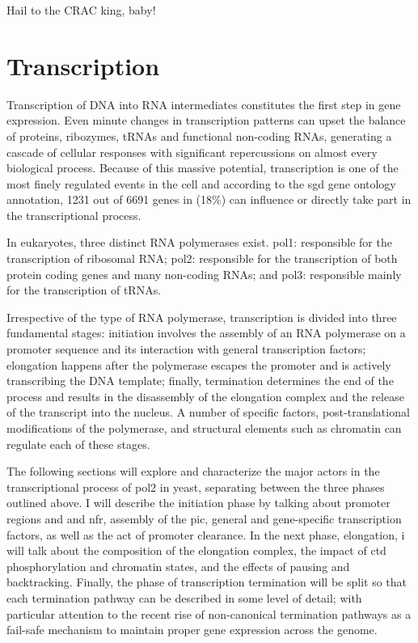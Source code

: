 \begin{savequote}[70mm]
Hail to the CRAC king, baby!
\end{savequote}

\chapter{Transcription}

Transcription of DNA into RNA intermediates constitutes the first step in gene expression.
Even minute changes in transcription patterns can upset the balance of proteins, ribozymes, tRNAs and functional non-coding RNAs, generating a cascade of cellular responses with  significant repercussions on almost every biological process.
Because of this massive potential, transcription is one of the most finely regulated events in the cell and according to the \gls{sgd} \cite{cherry:2012:saccharomyces} gene ontology annotation, 1231 out of 6691 genes in \cer (18\%) can influence or directly take part in the transcriptional process.

In eukaryotes, three distinct RNA polymerases exist. \gls{pol1}: responsible for the transcription of ribosomal RNA; \gls{pol2}: responsible for the transcription of both protein coding genes and many non-coding RNAs; and \gls{pol3}: responsible mainly for the transcription of tRNAs. 

Irrespective of the type of RNA polymerase, transcription is divided into three fundamental stages: initiation involves the assembly of an RNA polymerase on a promoter sequence and its interaction with general transcription factors; elongation happens after the polymerase escapes the promoter and is actively transcribing the DNA template; finally, termination determines the end of the process and results in the disassembly of the elongation complex and the release of the transcript into the nucleus. 
A number of specific factors, post-translational modifications of the polymerase, and structural elements such as chromatin can regulate each of these stages.

The following sections will explore and characterize the major actors in the transcriptional process of \gls{pol2} in yeast, separating between the three phases outlined above.
I will describe the initiation phase by talking about promoter regions and and \gls{nfr}, assembly of the \gls{pic}, general and gene-specific transcription factors, as well as the act of promoter clearance.
In the next phase, elongation, i will talk about the composition of the elongation complex, the impact of \gls{ctd} phosphorylation and chromatin states, and the effects of pausing and backtracking.
Finally, the phase of transcription termination will be split so that each termination pathway can be described in some level of detail; with particular attention to the recent rise of non-canonical termination pathways as a fail-safe mechanism to maintain proper gene expression across the genome.   

